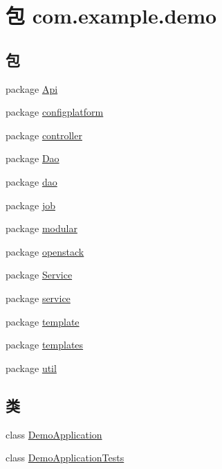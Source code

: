 \hypertarget{namespacecom_1_1example_1_1demo}{}\section{包 com.\+example.\+demo}
\label{namespacecom_1_1example_1_1demo}
\subsection*{包}
\begin{DoxyCompactItemize}
\item 
package \mbox{\hyperlink{namespacecom_1_1example_1_1demo_1_1_api}{Api}}
\item 
package \mbox{\hyperlink{namespacecom_1_1example_1_1demo_1_1configplatform}{configplatform}}
\item 
package \mbox{\hyperlink{namespacecom_1_1example_1_1demo_1_1controller}{controller}}
\item 
package \mbox{\hyperlink{namespacecom_1_1example_1_1demo_1_1_dao}{Dao}}
\item 
package \mbox{\hyperlink{namespacecom_1_1example_1_1demo_1_1dao}{dao}}
\item 
package \mbox{\hyperlink{namespacecom_1_1example_1_1demo_1_1job}{job}}
\item 
package \mbox{\hyperlink{namespacecom_1_1example_1_1demo_1_1modular}{modular}}
\item 
package \mbox{\hyperlink{namespacecom_1_1example_1_1demo_1_1openstack}{openstack}}
\item 
package \mbox{\hyperlink{namespacecom_1_1example_1_1demo_1_1_service}{Service}}
\item 
package \mbox{\hyperlink{namespacecom_1_1example_1_1demo_1_1service}{service}}
\item 
package \mbox{\hyperlink{namespacecom_1_1example_1_1demo_1_1template}{template}}
\item 
package \mbox{\hyperlink{namespacecom_1_1example_1_1demo_1_1templates}{templates}}
\item 
package \mbox{\hyperlink{namespacecom_1_1example_1_1demo_1_1util}{util}}
\end{DoxyCompactItemize}
\subsection*{类}
\begin{DoxyCompactItemize}
\item 
class \mbox{\hyperlink{classcom_1_1example_1_1demo_1_1_demo_application}{Demo\+Application}}
\item 
class \mbox{\hyperlink{classcom_1_1example_1_1demo_1_1_demo_application_tests}{Demo\+Application\+Tests}}
\end{DoxyCompactItemize}
